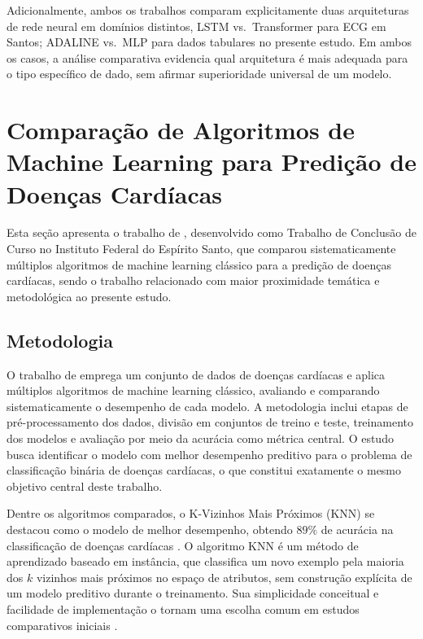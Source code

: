 Adicionalmente, ambos os trabalhos comparam explicitamente duas arquiteturas de rede neural em domínios distintos, LSTM vs.\ Transformer para ECG em Santos; ADALINE vs.\ MLP para dados tabulares no presente estudo. Em ambos os casos, a análise comparativa evidencia qual arquitetura é mais adequada para o tipo específico de dado, sem afirmar superioridade universal de um modelo.


\section{Compara\c c\~ao de Algoritmos de Machine Learning para Predi\c c\~ao de Doen\c cas Card\'iacas}

Esta se\c c\~ao apresenta o trabalho de , desenvolvido como Trabalho de Conclus\~ao de Curso no Instituto Federal do Esp\'irito Santo, que comparou sistematicamente m\'ultiplos algoritmos de machine learning cl\'assico para a predi\c c\~ao de doen\c cas card\'iacas, sendo o trabalho relacionado com maior proximidade tem\'atica e metodol\'ogica ao presente estudo.

\subsection{Metodologia}

O trabalho de  emprega um conjunto de dados de doen\c cas card\'iacas e aplica m\'ultiplos algoritmos de machine learning cl\'assico, avaliando e comparando sistematicamente o desempenho de cada modelo. A metodologia inclui etapas de pr\'e-processamento dos dados, divis\~ao em conjuntos de treino e teste, treinamento dos modelos e avalia\c c\~ao por meio da acur\'acia como m\'etrica central. O estudo busca identificar o modelo com melhor desempenho preditivo para o problema de classifica\c c\~ao bin\'aria de doen\c cas card\'iacas, o que constitui exatamente o mesmo objetivo central deste trabalho.

Dentre os algoritmos comparados, o K-Vizinhos Mais Pr\'oximos (KNN) se destacou como o modelo de melhor desempenho, obtendo $89\%$ de acur\'acia na classifica\c c\~ao de doen\c cas card\'iacas \cite{ravani2024}. O algoritmo KNN \'e um m\'etodo de aprendizado baseado em inst\^ancia, que classifica um novo exemplo pela maioria dos $k$ vizinhos mais pr\'oximos no espa\c co de atributos, sem constru\c c\~ao expl\'icita de um modelo preditivo durante o treinamento. Sua simplicidade conceitual e facilidade de implementa\c c\~ao o tornam uma escolha comum em estudos comparativos iniciais \cite{silva2016}.


